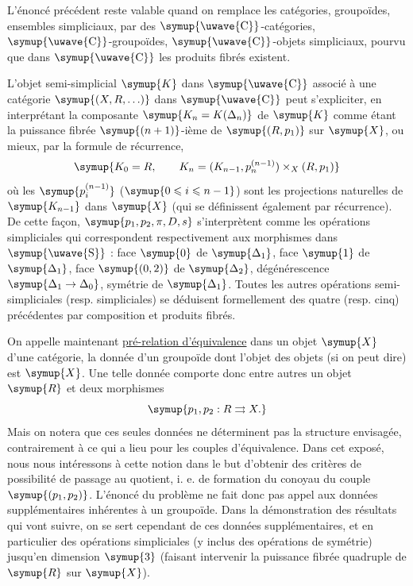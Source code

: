  L'énoncé précédent reste valable quand on remplace
les catégories, groupoïdes, ensembles simpliciaux, par des
$\symup{\text{\uwave{C}}}$-catégories, $\symup{\text{\uwave{C}}}$-groupoïdes, $\symup{\text{\uwave{C}}}$-objets
simpliciaux, pourvu que dans $\symup{\text{\uwave{C}}}$ les produits fibrés existent.

L'objet semi-simplicial $\symup{K}$ dans $\symup{\text{\uwave{C}}}$ associé à une catégorie
$\symup{(X,R,\ldots)}$ dans $\symup{\text{\uwave{C}}}$ peut s'expliciter, en interprétant la
composante $\symup{K_n=K(\Delta_n)}$ de $\symup{K}$ comme étant la puissance fibrée
$\symup{(n+1)}$-ième de $\symup{(R,p_1)}$ sur $\symup{X}$, ou mieux,
par la formule de récurrence,
\[
  \symup{K_0=R,\qquad
  K_n=(K_{n-1},p_n^{(n-1)})\times_X(R,p_1)}
\]
où les $\symup{p_i^{(n-1)}}$ ($\symup{0\leqslant i\leqslant n-1}$) sont les projections naturelles de
$\symup{K_{n-1}}$ dans $\symup{X}$ (qui se définissent également par récurrence). De cette
façon, $\symup{p_1,p_2,\pi,D,s}$ s'interprètent comme les opérations simpliciales qui
correspondent respectivement aux morphismes dans $\symup{\text{\uwave{S}}}$ : face $\symup{0}$ de
$\symup{\Delta_1}$, face $\symup{1}$ de $\symup{\Delta_1}$, face $\symup{(0,2)}$ de $\symup{\Delta_2}$,
dégénérescence $\symup{\Delta_1\to\Delta_0}$, symétrie de $\symup{\Delta_1}$. Toutes les
autres opérations semi-simpliciales (resp. simpliciales) se déduisent
formellement des quatre (resp. cinq) précédentes par composition et produits
fibrés.

On appelle maintenant \uline{pré-relation d'équivalence} dans un objet $\symup{X}$
d'une catégorie, la donnée d'un groupoïde dont l'objet des objets (si on peut
dire) est $\symup{X}$. Une telle donnée comporte donc entre autres un objet $\symup{R}$ et
deux morphismes
\[
  \symup{p_1,p_2:R\rightrightarrows X.}
\]
Mais on notera que ces seules données ne déterminent pas la structure
envisagée, contrairement à ce qui a lieu pour les couples d'équivalence. Dans
cet exposé, nous nous intéressons à cette notion dans le but d'obtenir des
critères de possibilité de passage au quotient, i. e. de formation du conoyau
du couple $\symup{(p_1,p_2)}$. L'énoncé du problème ne fait donc pas appel aux données
supplémentaires inhérentes à un groupoïde. Dans la démonstration des résultats
qui vont suivre, on se
sert cependant de ces données supplémentaires, et en particulier des
opérations simpliciales (y inclus des opérations de symétrie) jusqu'en
dimension $\symup{3}$ (faisant intervenir la puissance fibrée quadruple de $\symup{R}$ sur
$\symup{X}$).


